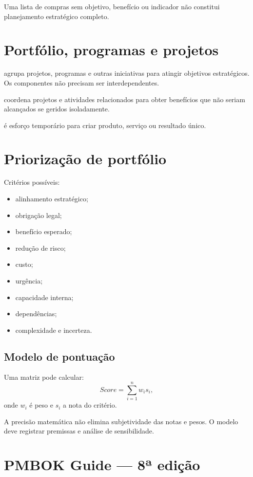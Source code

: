 Uma lista de compras sem objetivo, benefício ou indicador não constitui planejamento estratégico completo.

\section{Portfólio, programas e projetos}

 agrupa projetos, programas e outras iniciativas para atingir objetivos estratégicos. Os componentes não precisam ser interdependentes.

 coordena projetos e atividades relacionados para obter benefícios que não seriam alcançados se geridos isoladamente.

 é esforço temporário para criar produto, serviço ou resultado único.

\section{Priorização de portfólio}

Critérios possíveis:
\begin{itemize}
\item alinhamento estratégico;
\item obrigação legal;
\item benefício esperado;
\item redução de risco;
\item custo;
\item urgência;
\item capacidade interna;
\item dependências;
\item complexidade e incerteza.
\end{itemize}

\subsection{Modelo de pontuação}

Uma matriz pode calcular:
\[
Score=\sum_{i=1}^{n} w_i s_i,
\]
onde $w_i$ é peso e $s_i$ a nota do critério.

A precisão matemática não elimina subjetividade das notas e pesos. O modelo deve registrar premissas e análise de sensibilidade.

\section{PMBOK Guide — 8ª edição}

